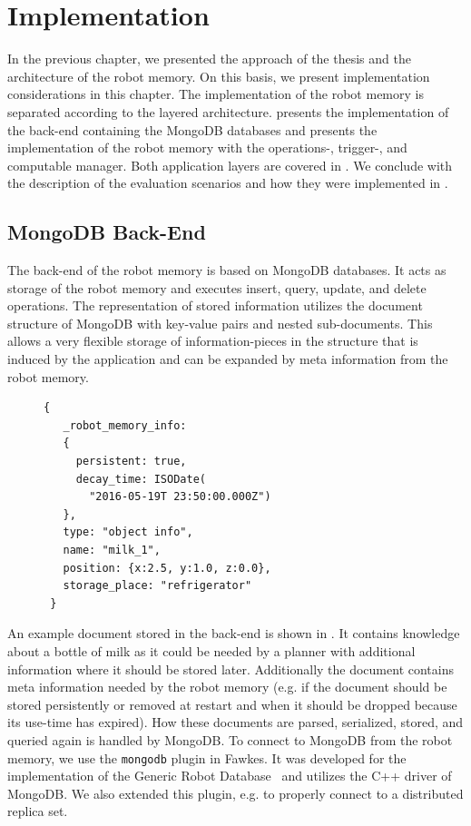 \chapter{Implementation}
\label{sec:impl}
In the previous chapter, we presented the approach of the thesis and
the architecture of the robot memory. On this basis, we present
implementation considerations in this chapter. The implementation of
the robot memory is separated according to the layered
architecture.  presents the implementation of the
back-end containing the MongoDB databases and 
presents the implementation of the robot memory with the operations-,
trigger-, and computable manager. Both application layers are covered
in . We conclude with the description of the
evaluation scenarios and how they were implemented in
.

\section{MongoDB Back-End}
\label{sec:back-end}
The back-end of the robot memory is based on MongoDB databases. It
acts as storage of the robot memory and executes insert, query,
update, and delete operations. The representation of stored information
utilizes the document structure of MongoDB with key-value pairs and
nested sub-documents. This allows a very flexible storage of
information-pieces in the structure that is induced by the application
and can be expanded by meta information from the robot memory.

\begin{figure}
  \vspace{-0.8cm}
\begin{lstlisting}[style=SmallJSON,
  caption={Representation of a knowledge piece in the back-end},
  label=lst:backend,
  framexleftmargin=1pt, xleftmargin=0pt,
 morekeywords={}, numbers=none]
 {
   _robot_memory_info:
   {
     persistent: true,
     decay_time: ISODate(
       "2016-05-19T 23:50:00.000Z")
   },
   type: "object info",
   name: "milk_1",
   position: {x:2.5, y:1.0, z:0.0},
   storage_place: "refrigerator"
 }
\end{lstlisting}
\vspace{-8mm}
\end{figure}
An example document stored in the back-end is shown in
. It contains knowledge about a bottle of milk as
it could be needed by a planner with additional information where it
should be stored later. Additionally the document contains meta
information needed by the robot memory (e.g. if the document should be
stored persistently or removed at restart and when it should be
dropped because its use-time has expired). How these documents are
parsed, serialized, stored, and queried again is handled by
MongoDB. To connect to MongoDB from the robot memory, we use the
\texttt{mongodb} plugin in Fawkes. It was developed for the
implementation of the Generic Robot Database~\cite{RoboDB} and
utilizes the C++ driver of MongoDB. We also extended this plugin,
e.g. to properly connect to a distributed replica set.

